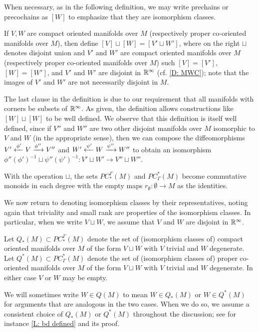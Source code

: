 When necessary, as in the following definition, we may write prechains or precochains as $[W]$ to emphasize that they are isomorphism classes.

\begin{definition}\label{D: prechain sum}
	If $V,W$ are compact oriented manifolds over $M$ (respectively proper co-oriented manifolds over $M$), then define $[V] \sqcup [W] = [V' \sqcup W']$, where on the right $\sqcup$ denotes disjoint union and $V'$ and $W'$ are compact oriented manifolds over $M$ (respectively proper co-oriented manifolds over $M$) such $[V]=[V']$, $[W]=[W']$, and $V'$ and $W'$ are disjoint in $\mathbb{R}^\infty$ (cf.
	\cref{D: MWC}); note that the images of $V'$ and $W'$ are not necessarily disjoint in $M$.
\end{definition}

The last clause in the definition is due to our requirement that all manifolds with corners be subsets of $\mathbb{R}^\infty$.
As given, the definition allows constructions like $[W]\sqcup[W]$ to be well defined.
We observe that this definition is itself well defined, since if $V''$ and $W''$ are two other disjoint manifolds over $M$ isomorphic to $V$ and $W$ (in the appropriate sense), then we can compose the diffeomorphisms $V'\xleftarrow{\phi'}V \xrightarrow{\phi''} V''$ and $W'\xleftarrow{\psi'}W \xrightarrow{\psi''} W''$ to obtain an isomorphism $\phi''(\phi')^{-1} \sqcup \psi''(\psi')^{-1} \colon V' \sqcup W' \to V'' \sqcup W''$.

With the operation $\sqcup$, the sets $PC^\Gamma_*(M)$ and $PC_\Gamma^*(M)$ become commutative monoids in each degree with the empty maps $r_\emptyset \colon \emptyset \to M$ as the identities.

We now return to denoting isomorphism classes by their representatives, noting again that triviality and small rank are properties of the isomorphism classes.
In particular, when we write $V \sqcup W$, we assume that $V$ and $W$ are disjoint in $\mathbb{R}^\infty$.

\begin{definition}\label{D: Q}
	Let $Q_*(M) \subset PC^\Gamma_*(M)$ denote the set of (isomorphism classes of) compact oriented manifolds over $M$ of the form $V \sqcup W$ with $V$ trivial and $W$ degenerate.
	Let $Q^*(M) \subset PC_\Gamma^*(M)$ denote the set of (isomorphism classes of) proper co-oriented manifolds over $M$ of the form $V \sqcup W$ with $V$ trivial and $W$ degenerate.
	In either case $V$ or $W$ may be empty.

	We will sometimes write $W \in Q(M)$ to mean $W \in Q_*(M)$ or $W \in Q^*(M)$ for arguments that are analogous in the two cases.
	When we do so, we assume a consistent choice of $Q_*(M)$ or $Q^*(M)$ throughout the discussion; see for instance \cref{L: bd defined} and its proof.
\end{definition}

